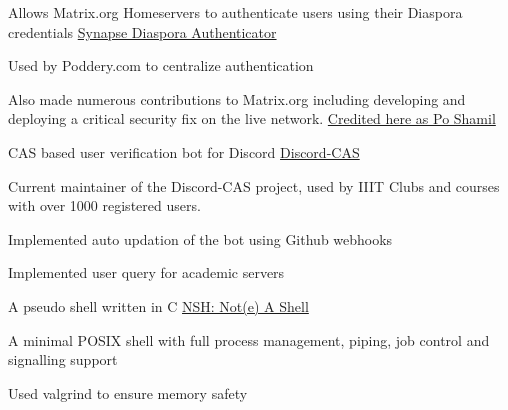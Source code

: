 \begin{cventries}
	\cventry
	{Allows Matrix.org Homeservers to authenticate users using their Diaspora credentials} %
	{\href{https://matrix.org/docs/projects/other/synapse-diaspora-auth}{Synapse Diaspora Authenticator}} %
	{} %
	{} %
	{
	  \begin{cvitems} %
		\item {Used by Poddery.com to centralize authentication}
		\item {Also made numerous contributions to Matrix.org including developing and deploying a critical security fix on the live network. \href{https://matrix.org/blog/2018/05/01/security-update-synapse-0-28-1/}{Credited here as Po Shamil}}
	  \end{cvitems}
	}

	\cventry
    {CAS based user verification bot for Discord} %
    {\href{https://github.com/Opensource-IIITH/Discord-CAS}{Discord-CAS}} %
    {} %
    {} %
    {
      \begin{cvitems} %
      	\item {Current maintainer of the Discord-CAS project, used by IIIT Clubs and courses with over 1000 registered users.}
		\item {Implemented auto updation of the bot using Github webhooks}
		\item {Implemented user query for academic servers}
      \end{cvitems}
    }

	\cventry
    {A pseudo shell written in C} %
    {\href{https://github.com/necessary129/nsh}{NSH: Not(e) A Shell}} %
    {} %
    {} %
    {
      \begin{cvitems} %
      	\item {A minimal POSIX shell with full process management, piping, job control and signalling support}
      	\item {Used valgrind to ensure memory safety}
      \end{cvitems}
    }
\end{cventries}
